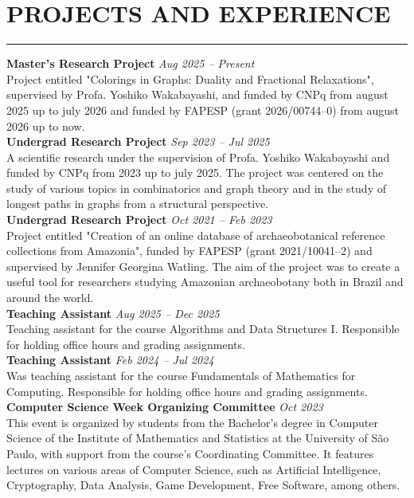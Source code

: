 \documentclass[a4paper,10pt]{article}
\begin{document}
\section*{PROJECTS AND EXPERIENCE}
\vspace{-1.5em} %
\noindent\rule{\textwidth}{0.4pt} %

\noindent\textbf{Master's Research Project}  \hfill  \textit{Aug 2025 -- Present} \\
Project entitled "Colorings in Graphs: Duality and Fractional Relaxations", supervised by Profa. Yoshiko Wakabayashi, and funded by CNPq from august 2025 up to july 2026 and funded by FAPESP (grant 2026/00744--0) from august 2026 up to now. \\

\noindent\textbf{Undergrad Research Project}  \hfill  \textit{Sep 2023 -- Jul 2025} \\
A scientific research under the supervision of Profa. Yoshiko Wakabayashi and funded by CNPq from 2023
up to july 2025. The project was centered on the study of various topics in combinatorics and graph theory and in the study of longest paths in graphs from a structural perspective. \\

\noindent\textbf{Undergrad Research Project}  \hfill  \textit{Oct 2021 -- Feb 2023} \\
Project entitled "Creation of an online database of archaeobotanical reference collections from Amazonia", funded by FAPESP (grant 2021/10041--2) and supervised by Jennifer Georgina Watling. The aim of the project was to create a useful tool for researchers studying Amazonian archaeobotany both in Brazil and around the world. \\ 

\noindent\textbf{Teaching Assistant}  \hfill  \textit{Aug 2025 -- Dec 2025}\\
Teaching assistant for the course Algorithms and Data Structures I.
Responsible for holding office hours and grading assignments. \\

\noindent\textbf{Teaching Assistant}  \hfill  \textit{Feb 2024 -- Jul 2024}\\
Was teaching assistant for the course Fundamentals of Mathematics for Computing.
Responsible for holding office hours and grading assignments. \\

\noindent\textbf{Computer Science Week Organizing Committee} \hfill  \textit{Oct 2023}\\
This event is organized by students from the Bachelor’s degree in Computer Science of the Institute of Mathematics and Statistics at the University of São Paulo, with support from the course's Coordinating Committee. It features lectures on various areas of Computer Science, such as Artificial Intelligence, Cryptography, Data Analysis, Game Development, Free Software, among others. \\
\end{document}
